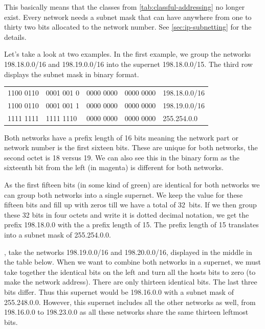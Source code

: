 This basically means that the classes from \vref{tab:classful-addressing} no longer exist.
Every network needs a subnet mask that can have anywhere from one to thirty two bits allocated to the network number.
See \vref{sec:ip-subnetting} for the details.

Let's take a look at two examples.
In the first example, we group the networks 198.18.0.0/16 and 198.19.0.0/16 into the supernet 198.18.0.0/15.
The third row displays the subnet mask in binary format.

\begin{center}
\tosfstyle
\begin{tabular}{@{}l@{.}l@{.}l@{.}l@{\quad}l@{}}
\color{spot1} 1100 0110 & 0001 001\color{spot2} 0 & 0000 0000 & 0000 0000 & 198.18.0.0/16 \\
\color{spot1} 1100 0110 & 0001 001\color{spot2} 1 & 0000 0000 & 0000 0000 & 198.19.0.0/16 \\
\midrule
\textcolor{spot1}{1111 1111} & \textcolor{spot1}{1111 111}0 & 0000 0000 & 0000 0000 & 255.254.0.0 \\
\end{tabular}
\end{center}

Both networks have a prefix length of 16 bits meaning the network part or network number is the first sixteen bits.
These are unique for both networks, the second octet is 18 versus 19.
We can also see this in the binary form as the sixteenth bit from the left (in \textcolor{spot2}{magenta}) is different for both networks.

As the first fifteen bits (in \textcolor{spot1}{some kind of green}) are iden\-ti\-cal for both networks we can group both networks into a single supernet.
We keep the value for these fifteen bits and fill up with zeros till we have a total of 32~bits.
If we then group these 32 bits in four octets and write it is dotted decimal notation, we get the prefix 198.18.0.0 with the a prefix length of 15.
The prefix length of 15 translates into a subnet mask of 255.254.0.0.

, take the networks 198.19.0.0/16 and 198.20.0.0/16, displayed in the middle in the table below.
When we want to combine both networks in a supernet, we must take together the identical bits on the left and turn all the hosts bits to zero (to make the network address).
There are only thirteen identical bits. The last three bits differ.
Thus this supernet would be 198.16.0.0 with a subnet mask of 255.248.0.0.
However, this supernet includes all the other networks as well, from 198.16.0.0 to 198.23.0.0 as all these networks share the same thirteen leftmost bits.




